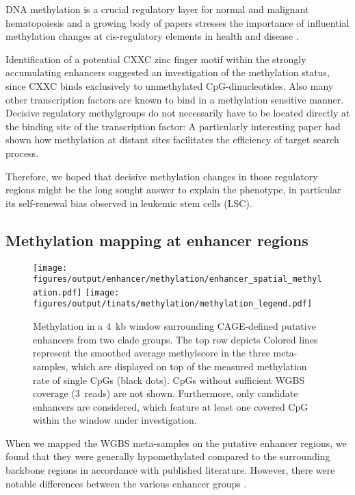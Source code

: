 DNA methylation is a crucial regulatory layer for normal and malignant hematopoiesis and a growing body of papers stresses the importance of influential methylation changes at cis-regulatory elements in health and disease \cite{Stadler2011,Hon2013,Kieffer-Kwon2013,Schlesinger2013,Varley2013,Sheaffer2014}. 

Identification of a potential CXXC zinc finger motif within the strongly accumulating enhancers suggested an investigation of the methylation status, since CXXC binds exclusively to unmethylated CpG-dinucleotides\cite{Allen2006}. Also many other transcription factors are known to bind in a methylation sensitive manner\cite{Hu2013,Yin2017a}. Decisive regulatory methylgroups do not necessarily have to be located directly at the binding site of the transcription factor: A particularly interesting paper had shown how methylation at distant sites facilitates the efficiency of  target search process\cite{Kemme2017}. 

Therefore, we hoped that decisive methylation changes in those regulatory regions might be the long sought answer to explain the \dnmtchip phenotype, in particular its self-renewal bias observed in leukemic stem cells (LSC)\cite{Vockentanz2011}. 

\subsection{Methylation mapping at enhancer regions}
\label{chap:r:enhancers:motifs:methylation:overall}

\begin{figure}[!htb]
	\centering
	\texttt{[image: figures/output/enhancer/methylation/enhancer\_spatial\_methylation.pdf]} 
	\texttt{[image: figures/output/tinats/methylation/methylation\_legend.pdf]} 
	\caption{Methylation in a \SI{4}{kb} window surrounding CAGE-defined putative enhancers from two clade groups. The top row depicts Colored lines represent the smoothed average methylscore in the three meta-samples, which are displayed on top of the measured methylation rate of single CpGs (black dots). CpGs without sufficient WGBS coverage (\SI{3}{reads}) are not shown. Furthermore, only candidate enhancers are considered, which feature at least one covered CpG within the window under investigation.}
	\label{fig:enhancers:motifs:enhancer_spatial_methylation}
\end{figure}

When we mapped the WGBS meta-samples  on the putative enhancer regions, we found that they were generally hypomethylated compared to the surrounding backbone regions in accordance with published literature\cite{Stadler2011}. However, there were notable differences between the various enhancer groups . 

